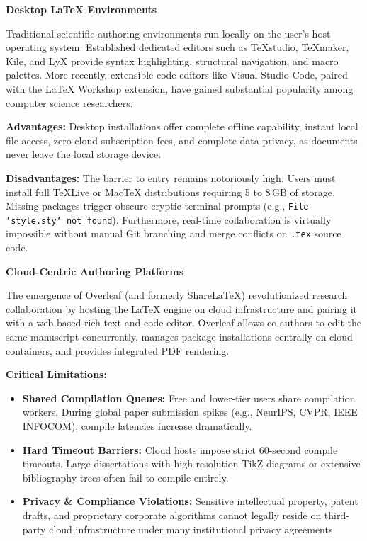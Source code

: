 \documentclass[12pt,a4paper,twoside]{article}
\newcommand{\subhead}[2]{%
  \begingroup\setlength{\parskip}{0pt}\vspace{10pt}%
  \noindent\hspace*{0.25in}\makebox[0.35in][l]{\fontsize{13pt}{15.6pt}\selectfont\bfseries #1}%
  {\fontsize{13pt}{15.6pt}\selectfont\bfseries #2}\par\nopagebreak
  \vspace{4pt}
  \endgroup}
\newcommand{\code}[1]{\texttt{#1}}
\begin{document}
\subhead{2.1}{Desktop \LaTeX{} Environments}
Traditional scientific authoring environments run locally on the user's host operating system. Established dedicated editors such as \TeX{}studio, \TeX{}maker, Kile, and LyX provide syntax highlighting, structural navigation, and macro palettes. More recently, extensible code editors like Visual Studio Code, paired with the \LaTeX{} Workshop extension, have gained substantial popularity among computer science researchers.

\textbf{Advantages:} Desktop installations offer complete offline capability, instant local file access, zero cloud subscription fees, and complete data privacy, as documents never leave the local storage device.

\textbf{Disadvantages:} The barrier to entry remains notoriously high. Users must install full \TeX{}Live or Mac\TeX{} distributions requiring 5 to 8\,GB of storage. Missing packages trigger obscure cryptic terminal prompts (e.g., \code{File `style.sty` not found}). Furthermore, real-time collaboration is virtually impossible without manual Git branching and merge conflicts on \code{.tex} source code.

\subhead{2.2}{Cloud-Centric Authoring Platforms}
The emergence of Overleaf (and formerly Share\LaTeX{}) revolutionized research collaboration by hosting the \LaTeX{} engine on cloud infrastructure and pairing it with a web-based rich-text and code editor. Overleaf allows co-authors to edit the same manuscript concurrently, manages package installations centrally on cloud containers, and provides integrated PDF rendering.

\textbf{Critical Limitations:}
\begin{itemize}[leftmargin=0.4in,itemsep=2pt,topsep=2pt,parsep=0pt]
    \item \textbf{Shared Compilation Queues:} Free and lower-tier users share compilation workers. During global paper submission spikes (e.g., NeurIPS, CVPR, IEEE INFOCOM), compile latencies increase dramatically.
    \item \textbf{Hard Timeout Barriers:} Cloud hosts impose strict 60-second compile timeouts. Large dissertations with high-resolution TikZ diagrams or extensive bibliography trees often fail to compile entirely.
    \item \textbf{Privacy \& Compliance Violations:} Sensitive intellectual property, patent drafts, and proprietary corporate algorithms cannot legally reside on third-party cloud infrastructure under many institutional privacy agreements.
\end{itemize}
\end{document}
